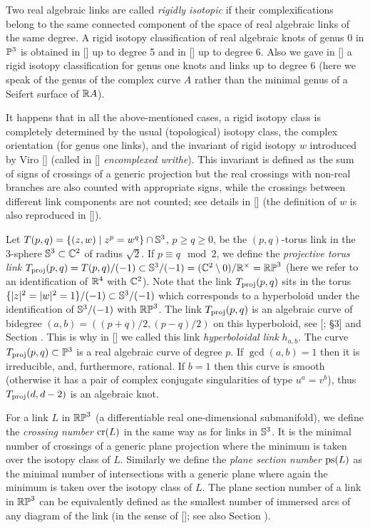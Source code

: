 Two real algebraic links are called {\it rigidly isotopic} if their complexifications belong to the same
connected component of the space of real algebraic links of the same degree.
A rigid isotopy classification of real algebraic knots of genus $0$ in $\P^3$ is obtained in [] up to degree 5
and in [] up to degree 6. Also we gave in [] a rigid isotopy classification for genus one knots
and links up to degree 6 (here we speak of the genus of the complex curve $A$ rather than the
minimal genus of a Seifert surface of $\R A$).

It happens that in all the above-mentioned cases, a rigid isotopy class is
completely determined by the usual (topological) isotopy class, the complex orientation (for genus one links),
and the invariant of rigid isotopy $w$ introduced by Viro [] (called in [] {\it encomplexed writhe\/}).
This invariant is defined as the sum of signs of crossings of a generic projection but the real
crossings with non-real branches are also counted with appropriate signs, while the crossings
between different link components are not counted; see details in []
(the definition of $w$ is also reproduced in []).

Let $T(p,q)=\{(z,w)\mid z^p=w^q\}\cap \sph^3$, $p\ge q\ge 0$,
be the $(p,q)$-torus link in the 3-sphere $\sph^3\subset\C^2$ of radius $\sqrt2$.
If $p\equiv q\mod2$, we define the {\it projective torus link} %
$\Tproj(p,q) = T(p,q)/(-1) \subset \sph^3/(-1) = (\C^2\setminus 0)/\R^{\times}=\RP^3$
(here we refer to an identification of $\R^4$ with $\C^2$).
Note that the link $\Tproj(p,q)$ sits in the torus $\{|z|^2=|w|^2=1\}/(-1)\subset\sph^3/(-1)$
which corresponds to a hyperboloid under the identification of $\sph^3/(-1)$ with $\RP^3$.
The link $\Tproj(p,q)$ is an algebraic curve of bidegree $(a,b)=((p+q)/2,(p-q)/2)$ on this hyperboloid,
see [; \S3] and Section \sectHabTpq.
This is why in [] we called this link {\it hyperboloidal link} $h_{a,b}$.
The curve $\Tproj(p,q)\subset\P^3$ is a real algebraic curve of degree $p$.
If $\gcd(a,b)=1$ then it is irreducible, and, furthermore, rational.
If $b=1$ then this curve is smooth (otherwise it has a pair of complex conjugate singularities
of type $u^a=v^b$), thus $\Tproj(d,d-2)$ is an algebraic knot.


\smallskip
For a link $L$ in $\RP^3$ (a differentiable real one-dimensional submanifold),
we define the {\it crossing number} $\cn(L)$ in the same way as for links in $\sph^3$. It is
the minimal number of crossings of a generic plane projection where the minimum is taken over
the isotopy class of $L$. Similarly we define the {\it plane section number} $\ps(L)$
as the minimal number of intersections with a generic plane where again the minimum is taken 
over the isotopy class of $L$.
The plane section number of a link in $\RP^3$ can be equivalently defined as the
smallest number of immersed arcs of any diagram of the link (in the sense of []; see also
Section \sectDiagr).


